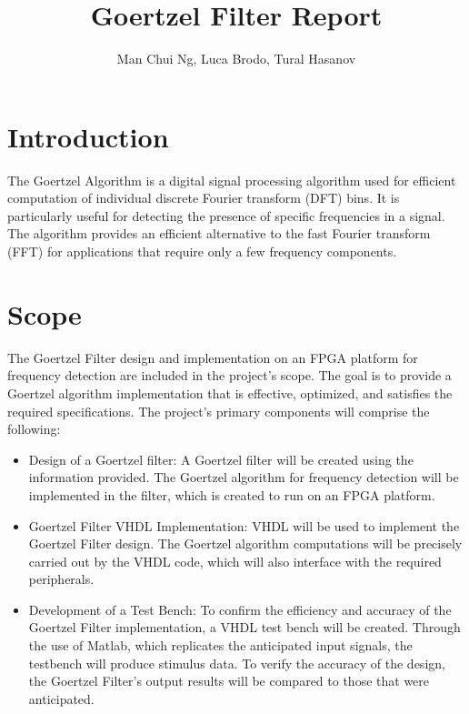 \documentclass{article}
\title{Goertzel Filter Report}
\author{Man Chui Ng, Luca Brodo, Tural Hasanov}
\begin{document}
\maketitle

\section{Introduction}
The Goertzel Algorithm is a digital signal processing algorithm used for efficient computation of individual discrete Fourier transform (DFT) bins. It is particularly useful for detecting the presence of specific frequencies in a signal. The algorithm provides an efficient alternative to the fast Fourier transform (FFT) for applications that require only a few frequency components. 

\section{Scope}
The Goertzel Filter design and implementation on an FPGA platform for frequency detection are included in the project's scope. The goal is to provide a Goertzel algorithm implementation that is effective, optimized, and satisfies the required specifications. The project's primary components will comprise the following: 
\begin{itemize}
    \item Design of a Goertzel filter: A Goertzel filter will be created using the information provided. The Goertzel algorithm for frequency detection will be implemented in the filter, which is created to run on an FPGA platform.
\end{itemize}
\begin{itemize}
    \item Goertzel Filter VHDL Implementation: VHDL will be used to implement the Goertzel Filter design. The Goertzel algorithm computations will be precisely carried out by the VHDL code, which will also interface with the required peripherals.
\end{itemize}
\begin{itemize}
    \item Development of a Test Bench: To confirm the efficiency and accuracy of the Goertzel Filter implementation, a VHDL test bench will be created. Through the use of Matlab, which replicates the anticipated input signals, the testbench will produce stimulus data. To verify the accuracy of the design, the Goertzel Filter's output results will be compared to those that were anticipated.
\end{itemize}
\end{document}
